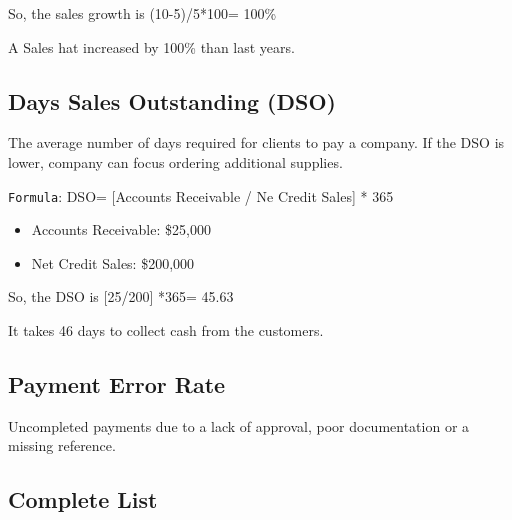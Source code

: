 \documentclass[]{book}
\providecommand{\tightlist}{%
  \setlength{\itemsep}{0pt}\setlength{\parskip}{0pt}}
\begin{document}
So, the sales growth is (10-5)/5*100= 100\%

A Sales hat increased by 100\% than last years.

\subsection{Days Sales Outstanding
(DSO)}\label{days-sales-outstanding-dso}

The average number of days required for clients to pay a company. If the
DSO is lower, company can focus ordering additional supplies.

\texttt{Formula}: DSO= {[}Accounts Receivable / Ne Credit Sales{]} * 365

\begin{itemize}
\tightlist
\item
  Accounts Receivable: \$25,000
\item
  Net Credit Sales: \$200,000
\end{itemize}

So, the DSO is {[}25/200{]} *365= 45.63

It takes 46 days to collect cash from the customers.

\subsection{Payment Error Rate}\label{payment-error-rate}

Uncompleted payments due to a lack of approval, poor documentation or a
missing reference.

\subsection{Complete List}\label{complete-list}
\end{document}
